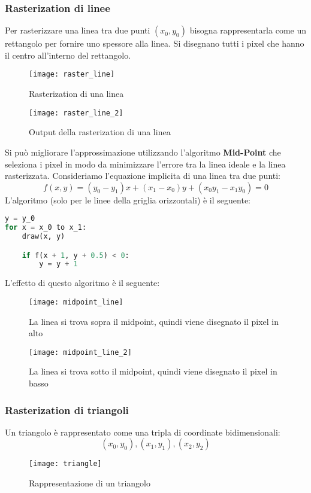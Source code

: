 \documentclass[a4paper]{article}
\begin{document}
\subsubsection{Rasterization di linee}
Per rasterizzare una linea tra due punti \( (x_0, y_0) \) bisogna rappresentarla come
un rettangolo per fornire uno spessore alla linea. Si disegnano tutti i pixel che hanno
il centro all'interno del rettangolo.
\begin{figure}[H]
  \centering
  \begin{minipage}{0.48\textwidth}
     \centering
     \texttt{[image: raster\_line]}
     \caption{Rasterization di una linea}
   \end{minipage}\hfill
   \begin{minipage}{0.48\textwidth}
     \centering
     \texttt{[image: raster\_line\_2]}
     \caption{Output della rasterization di una linea}
   \end{minipage}
\end{figure}
\noindent
Si può migliorare l'approssimazione utilizzando l'algoritmo \textbf{Mid-Point}
che seleziona i pixel in modo da minimizzare l'errore tra la linea ideale e la
linea rasterizzata. Consideriamo l'equazione implicita di una linea tra due punti:
\[
  f(x,y) = (y_0 - y_1)x + (x_1 - x_0)y + (x_0y_1 - x_1y_0) = 0
\] 
L'algoritmo (solo per le linee della griglia orizzontali) è il seguente:
\begin{lstlisting}[language=Python]
y = y_0
for x = x_0 to x_1:
    draw(x, y)

    if f(x + 1, y + 0.5) < 0:
        y = y + 1
\end{lstlisting}
L'effetto di questo algoritmo è il seguente:
\begin{figure}[H]
  \centering
  \begin{minipage}{0.48\textwidth}
     \centering
     \texttt{[image: midpoint\_line]}
     \caption{La linea si trova sopra il midpoint, quindi viene disegnato il pixel in alto}
   \end{minipage}\hfill
   \begin{minipage}{0.48\textwidth}
     \centering
     \texttt{[image: midpoint\_line\_2]}
     \caption{La linea si trova sotto il midpoint, quindi viene disegnato il pixel in basso}
  \end{minipage}
\end{figure}

\subsubsection{Rasterization di triangoli}
Un triangolo è rappresentato come una tripla di coordinate bidimensionali:
\[
  (x_0, y_0), (x_1, y_1), (x_2, y_2)
\] 
\begin{figure}[H]
  \centering
  \texttt{[image: triangle]}
  \caption{Rappresentazione di un triangolo}
\end{figure}
\end{document}
